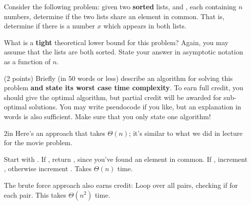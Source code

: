 \begin{prob}[(3 points)]

    Consider the following problem: given two \textbf{sorted} lists, 
    and , each containing $n$ numbers, determine if the two lists
    share an element in common. That is, determine if there is a number $x$
    which appears in both lists.

    \begin{subprobset}

        \begin{subprob}
            What is a \textbf{tight} theoretical lower bound for this problem?
            Again, you may assume that the lists are both sorted.
            State your answer in asymptotic notation as a function of $n$.

        \end{subprob}

        \begin{subprob}(2 points)
            Briefly (in 50 words or less) describe an algorithm for solving
            this problem \textbf{and state its worst case time complexity}. To
            earn full credit, you should give the optimal algorithm, but
            partial credit will be awarded for sub-optimal solutions. You may
            write pseudocode if you like, but an explanation in words is also
            sufficient. Make sure that you only state one algorithm!

            \begin{responsebox}{2in}
                Here's an approach that takes $\Theta(n)$; it's similar to what we did in lecture
                for the movie problem.

                Start with . If , return , since
                you've found an element in common. If , increment , otherwise
                increment . Takes $\Theta(n)$ time.

                The brute force approach also earns credit: Loop over all pairs, checking if 
                 for each pair. This takes $\Theta(n^2)$ time.

            \end{responsebox}

        \end{subprob}

    \end{subprobset}

\end{prob}
